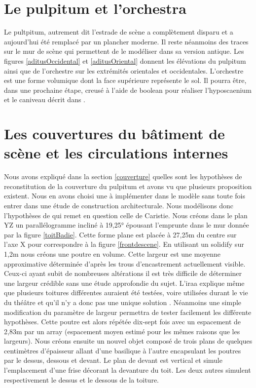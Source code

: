		\section{Le pulpitum et l'orchestra} 

Le pultpitum, autrement dit l'estrade de scène a complètement disparu et a aujourd'hui été remplacé par un plancher moderne. Il reste néanmoins des traces sur le mur de scène qui permettent de le modéliser dans sa version antique. Les figures \ref{aditusOccidental} et \ref{aditusOriental} donnent les élévations du pulpitum ainsi que de l'orchestre sur les extrémités orientales et occidentales. L'orchestre est une forme volumique dont la face supérieure représente le sol. Il pourra être, dans une prochaine étape, creusé à l'aide de \gls{boolean} pour réaliser l'hyposcaenium et le caniveau décrit dans \cite[Chap. VI]{orangeTxt}.

\section{Les couvertures du bâtiment de scène et les circulations internes}
\label{sect-couverture}

Nous avons expliqué dans la section \ref{couverture} quelles sont les hypothèses de reconstitution de la couverture du pulpitum et avons vu que plusieurs proposition existent. Nous en avons choisi une à implémenter dans le modèle sans toute fois entrer dans une étude de construction architecturale. Nous modélisons donc l'hypothèses de \cite[Chap. I, sect. 6]{orangeTxt} qui remet en question celle de Caristie. Nous créons dans le plan YZ un parallélogramme incliné à 19,25° épousant l'emprunte dans le mur donnée par la figure \ref{toitBadie}. Cette forme plane est placée à 27,25m du centre sur l'axe X pour correspondre à la figure \ref{frontdescene}. En utilisant un \gls{solidify} sur 1,2m nous créons une poutre en volume. Cette largeur est une moyenne approximative déterminée d'après les trous d'encastrement actuellement visible. Ceux-ci ayant subit de nombreuses altérations il est très difficile de déterminer une largeur crédible sans une étude approfondie du sujet. L'\gls{iraa} explique même que plusieurs toitures différentes auraient été testées, voire utilisées durant le vie du théâtre et qu'il n'y a donc pas une unique solution \cite[p. 34]{orangeTxt}. Néanmoins une simple modification du paramètre de largeur permettra de tester facilement les différente hypothèses. Cette poutre est alors répétée dix-sept fois avec un espacement de 2,83m par un \gls{array} (espacement moyen estimé pour les mêmes raisons que les largeurs). Nous créons ensuite un nouvel objet composé de trois plans de quelques centimètres d'épaisseur allant d'une basilique à l'autre encapsulant les poutres par le dessus, dessous et devant. Le plan de devant est vertical et simule l'emplacement d'une frise décorant la devanture du toit. Les deux autres simulent respectivement le dessus et le dessous de la toiture.

